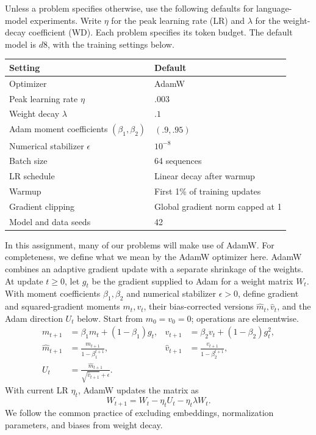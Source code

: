 Unless a problem specifies otherwise, use the following defaults for language-model
experiments. Write $\eta$ for the peak learning rate (LR) and $\lambda$ for the
weight-decay coefficient (WD). Each problem specifies its token budget.
The default model is $d8$, with the training settings below.

\begin{center}
\begin{tabular}{ll}
\toprule
Setting & Default \\
\midrule
Optimizer & AdamW \\
Peak learning rate $\eta$ & $.003$ \\
Weight decay $\lambda$ & $.1$ \\
Adam moment coefficients $(\beta_1,\beta_2)$ & $(.9,.95)$ \\
Numerical stabilizer $\epsilon$ & $10^{-8}$ \\
Batch size & 64 sequences \\
LR schedule & Linear decay after warmup \\
Warmup & First 1\% of training updates \\
Gradient clipping & Global gradient norm capped at 1 \\
Model and data seeds & 42 \\
\bottomrule
\end{tabular}
\end{center}

In this assignment, many of our problems will make use of AdamW. For completeness, we define what we mean by the AdamW optimizer here. AdamW combines an adaptive gradient update with a separate shrinkage of the weights.
At update $t\geq0$, let $g_t$ be the gradient supplied to Adam for a weight matrix $W_t$.
With moment coefficients $\beta_1,\beta_2$ and numerical stabilizer $\epsilon>0$,
define gradient and squared-gradient moments $m_t,v_t$, their bias-corrected
versions $\widehat m_t,\widehat v_t$, and the Adam direction $U_t$ below.
Start from $m_0=v_0=0$; operations are elementwise.
\[
\begin{aligned}
m_{t+1}&=\beta_1m_t+(1-\beta_1)g_t,
& v_{t+1}&=\beta_2v_t+(1-\beta_2)g_t^2,\\
\widehat m_{t+1}&=\frac{m_{t+1}}{1-\beta_1^{t+1}},
& \widehat v_{t+1}&=\frac{v_{t+1}}{1-\beta_2^{t+1}},\\
U_t&=\frac{\widehat m_{t+1}}{\sqrt{\widehat v_{t+1}}+\epsilon}.
\end{aligned}
\]
With current LR $\eta_t$,
AdamW updates the matrix as
\[
W_{t+1}=W_t-\eta_t U_t-\eta_t\lambda W_t.
\]
We follow the common practice of excluding embeddings, normalization parameters, and biases from weight decay.
